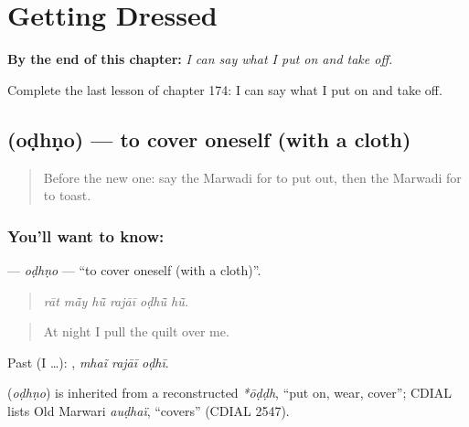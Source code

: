 
\chapter{Getting Dressed}
\label{ch:mw-getting-dressed}

\begin{chapteropening}
\textbf{By the end of this chapter:} \emph{I can say what I put on and take off.}

Complete the last lesson of chapter 174: I can say what I put on and take off.
\end{chapteropening}

\section[\texorpdfstring{\mw{ओढणो} (oḍhṇo)}{ओढणो (oḍhṇo)}]{ (oḍhṇo) — to cover oneself (with a cloth)}

\label{lesson:MW-C174-odhno}



\begin{quote}
Before the new one: say the Marwadi for to put out, then the Marwadi for to toast.
\end{quote}

\subsection*{You'll want to know: }
\textbf{} — \emph{oḍhṇo} — \textquotedblleft{}to cover oneself (with a cloth)\textquotedblright{}.

\begin{quote}
     
\end{quote}

\begin{quote}
\emph{rāt mā̃y hū̃ rajāī oḍhū̃ hū̃.}
\end{quote}

\begin{quote}
At night I pull the quilt over me.
\end{quote}

Past (I …):   , \emph{mhaĩ rajāī oḍhī}.

\begin{cousinweb}
\textbf{} (\emph{oḍhṇo}) is inherited from a reconstructed \emph{*ōḍḍh}, \textquotedblleft{}put on, wear, cover\textquotedblright{}; CDIAL lists Old Marwari \emph{auḍhaï}, \textquotedblleft{}covers\textquotedblright{} (CDIAL 2547).
\end{cousinweb}

